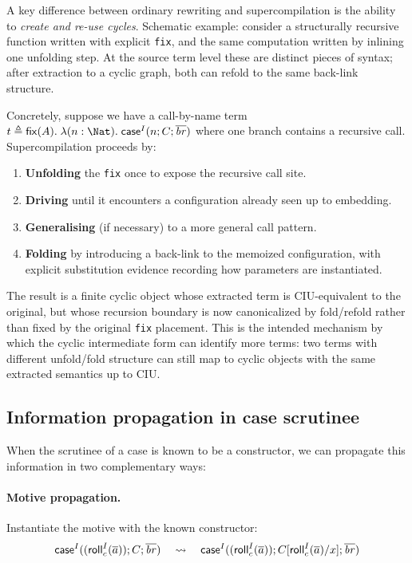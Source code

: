 A key difference between ordinary rewriting and supercompilation is the ability to \emph{create and re-use cycles}.
Schematic example: consider a structurally recursive function written with explicit \texttt{fix}, and the same computation written by inlining one unfolding step.
At the source term level these are distinct pieces of syntax; after extraction to a cyclic graph, both can refold to the same back-link structure.

Concretely, suppose we have a call-by-name term
\(
  t \triangleq \mathsf{fix}(A).\;\lambda(n: \Nat).\; \Case{I}{n}{C}{\overline{\mathit{br}}}
\)
where one branch contains a recursive call.
Supercompilation proceeds by:
\begin{enumerate}
\item \textbf{Unfolding} the \texttt{fix} once to expose the recursive call site.
\item \textbf{Driving} until it encounters a configuration already seen up to embedding.
\item \textbf{Generalising} (if necessary) to a more general call pattern.
\item \textbf{Folding} by introducing a back-link to the memoized configuration, with explicit substitution evidence recording how parameters are instantiated.
\end{enumerate}

The result is a finite cyclic object whose extracted term is CIU-equivalent to the original, but whose recursion boundary is now canonicalized by fold/refold rather than fixed by the original \texttt{fix} placement.
This is the intended mechanism by which the cyclic intermediate form can identify more terms: two terms with different unfold/fold structure can still map to cyclic objects with the same extracted semantics up to CIU.

\subsection{Information propagation in case scrutinee}

When the scrutinee of a case is known to be a constructor, we can propagate this information in two complementary ways:

\paragraph{Motive propagation.}
Instantiate the motive with the known constructor:
\[
\mathsf{case}^{I}((\mathsf{roll}^{I}_{c}(\overline{a}));C;\overline{\mathit{br}})
\quad\leadsto\quad
\mathsf{case}^{I}((\mathsf{roll}^{I}_{c}(\overline{a}));C[\mathsf{roll}^{I}_{c}(\overline{a})/x];\overline{\mathit{br}})
\]

